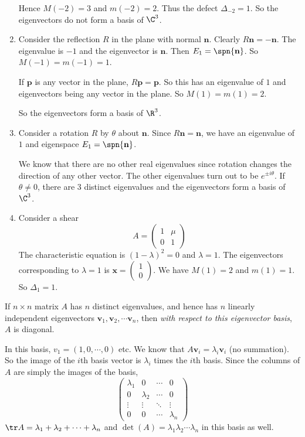 \documentclass[a4paper]{article}
\begin{document}
\begin{eg}
\begin{enumerate}
        Hence $M(-2) = 3$ and $m(-2) = 2$. Thus the defect $\Delta_{-2} = 1$. So the eigenvectors do not form a basis of $\C^3$.
      \item Consider the reflection $R$ in the plane with normal $\mathbf{n}$. Clearly $R\mathbf{n} = -\mathbf{n}$. The eigenvalue is $-1$ and the eigenvector is $\mathbf{n}$. Then $E_1 = \spn\{\mathbf{n}\}$. So $M(-1) = m(-1) = 1$.

        If $\mathbf{p}$ is any vector in the plane, $R\mathbf{p} = \mathbf{p}$. So this has an eigenvalue of $1$ and eigenvectors being any vector in the plane. So $M(1) = m(1) = 2$.

        So the eigenvectors form a basis of $\R^3$.
      \item Consider a rotation $R$ by $\theta$ about $\mathbf{n}$. Since $R\mathbf{n} = \mathbf{n}$, we have an eigenvalue of $1$ and eigenspace $E_1 = \spn\{\mathbf{n}\}$.

        We know that there are no other real eigenvalues since rotation changes the direction of any other vector. The other eigenvalues turn out to be $e^{\pm i\theta}$. If $\theta \not= 0$, there are 3 distinct eigenvalues and the eigenvectors form a basis of $\C^3$.
      \item Consider a shear
        \[
          A = 
          \begin{pmatrix}
            1&\mu\\0&1
          \end{pmatrix}
        \]
        The characteristic equation is $(1 - \lambda)^2 = 0$ and $\lambda = 1$. The eigenvectors corresponding to $\lambda = 1$ is $\mathbf{x} = 
        \begin{pmatrix}
          1\\0
        \end{pmatrix}$. We have $M(1) = 2$ and $m(1) = 1$. So $\Delta_1 = 1$.
    \end{enumerate}
  \end{eg}
  \note If $n\times n$ matrix $A$ has $n$ distinct eigenvalues, and hence has $n$ linearly independent eigenvectors $\mathbf{v}_1, \mathbf{v}_2, \cdots \mathbf{v}_n$, then \emph{with respect to this eigenvector basis}, $A$ is diagonal.

  In this basis, $v_1 = (1, 0, \cdots, 0)$ etc. We know that $A\mathbf{v}_i = \lambda_i\mathbf{v}_i$ (no summation). So the image of the $i$th basis vector is $\lambda_i$ times the $i$th basis. Since the columns of $A$ are simply the images of the basis,
  \[
    \begin{pmatrix}
      \lambda_1 & 0 & \cdots & 0\\
      0 & \lambda_2 & \cdots & 0\\
      \vdots & \vdots & \ddots & \vdots\\
      0 & 0 & \cdots & \lambda_n
    \end{pmatrix}
  \]
  \note $\tr A = \lambda_1 + \lambda_2 + \cdots + \lambda_n$ and $\det(A) = \lambda_1\lambda_2\cdots \lambda_n$ in this basis as well.
\end{document}
